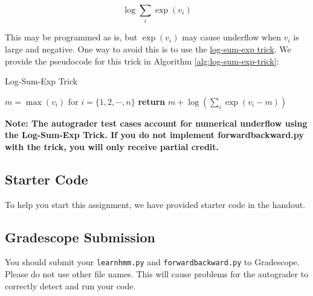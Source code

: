 \documentclass[11pt,addpoints,answers]{exam}
\begin{document}
$$ \log \sum_i \exp{(v_i)}$$

This may be programmed as is, but $\exp{(v_i)}$ may cause underflow when $v_i$ is large and negative. One way to avoid this is to use the \href{https://www.xarg.org/2016/06/the-log-sum-exp-trick-in-machine-learning/}{log-sum-exp trick}. We provide the pseudocode for this trick in Algorithm \ref{alg:log-sum-exp-trick}:

\begin{algorithm}[H]
    \caption{Log-Sum-Exp Trick}
    \label{alg:log-sum-exp-trick}
    \begin{algorithmic}[1]
            \State $m = \max(v_i)$ for $i=\{1, 2,\cdots, n\}$ 
            \State \textbf{return }{$m + \log(\sum_i\exp(v_i-m))$} 
        \EndProcedure
    \end{algorithmic}
\end{algorithm}

\textbf{Note: The autograder test cases account for numerical underflow using the Log-Sum-Exp Trick. If you do not implement \textbf{forwardbackward.py} with the trick, you will only receive partial credit.}

\subsection{Starter Code}

To help you start this assignment, we have provided starter code in the handout.

\subsection{Gradescope Submission}

You should submit your \texttt{learnhmm.py} and \texttt{forwardbackward.py} to Gradescope. Please do not use other file names. This will cause problems for the autograder to correctly detect and run your code.
\end{document}
